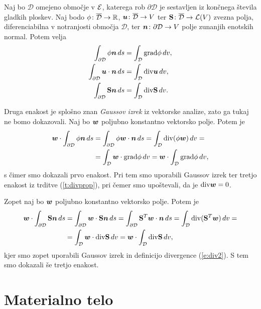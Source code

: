 \begin{izrek}
	Naj bo $\mathcal{D}$ omejeno območje v $\mathcal E$, katerega rob $\partial\mathcal{D}$ je sestavljen
	iz končnega števila gladkih ploskev. Naj bodo $\phi\colon\overline{\mathcal{D}}\to\mathbb R$,
	$\boldsymbol u\colon\overline{\mathcal{D}}\to V$ ter $\mathbf S\colon\overline{\mathcal{D}}\to\mathcal L(V)$
	zvezna polja, diferenciabilna v notranjosti območja $\mathcal{D}$, ter $\boldsymbol n\colon\partial\mathcal{D}\to V$
	polje zunanjih enotskih normal. Potem velja
	\begin{align}
		\int_{\partial\mathcal{D}} \phi\boldsymbol n\,ds &= \int_{\mathcal{D}} \mathrm{grad}\phi\,dv, \nonumber \\
		\int_{\partial\mathcal{D}} \boldsymbol u\cdot\boldsymbol n\,ds &= \int_{\mathcal{D}} \mathrm{div}\boldsymbol u\,dv, \\
		\int_{\partial\mathcal{D}} \mathbf S\boldsymbol n\,ds &= \int_{\mathcal{D}} \mathrm{div}\mathbf S\,dv. \nonumber
	\end{align}
\end{izrek}
\proof
	Druga enakost je splošno znan \emph{Gaussov izrek} iz vektorske analize, zato ga tukaj ne bomo dokazovali.
	Naj bo $\boldsymbol w$ poljubno konstantno vektorsko polje. Potem je
	\begin{align*}
		\boldsymbol w\cdot\int_{\partial\mathcal{D}}\phi\boldsymbol n\,ds &= \int_{\partial\mathcal{D}}\phi\boldsymbol w\cdot\boldsymbol n\,ds=
		\int_{\mathcal{D}}\mathrm{div}(\phi\boldsymbol w)\,dv = \\
		&= \int_{\mathcal{D}}\boldsymbol w\cdot\mathrm{grad}\phi \,dv = \boldsymbol w\cdot\int_{\mathcal{D}}\mathrm{grad}\phi \,dv,
	\end{align*}
	s čimer smo dokazali prvo enakost.
	Pri tem smo uporabili Gaussov izrek ter tretjo enakost iz trditve (\ref{t:divprop}), pri čemer
	smo upoštevali, da je $\mathrm{div}\boldsymbol w=0$.
	
	Zopet naj bo $\boldsymbol w$ poljubno konstantno vektorsko polje. Potem je
	\begin{align*}
		\boldsymbol w\cdot\int_{\partial\mathcal{D}}\mathbf S\boldsymbol n\,ds &= \int_{\partial\mathcal{D}}\boldsymbol w\cdot\mathbf S\boldsymbol n\,ds=
		\int_{\partial\mathcal{D}}\mathbf S^T\boldsymbol w\cdot\boldsymbol n\,ds=
		\int_{\mathcal{D}}\mathrm{div}(\mathbf S^T\boldsymbol w)\,dv = \\ &=\int_{\mathcal{D}}\boldsymbol w\cdot\mathrm{div}\mathbf S\,dv=
		\boldsymbol w\cdot\int_{\mathcal{D}}\mathrm{div}\mathbf S\,dv,
	\end{align*}
	kjer smo zopet uporabili Gaussov izrek in definicijo divergence (\ref{e:div2}). S tem smo dokazali še tretjo enakost.
\endproof


\section{Materialno telo}


